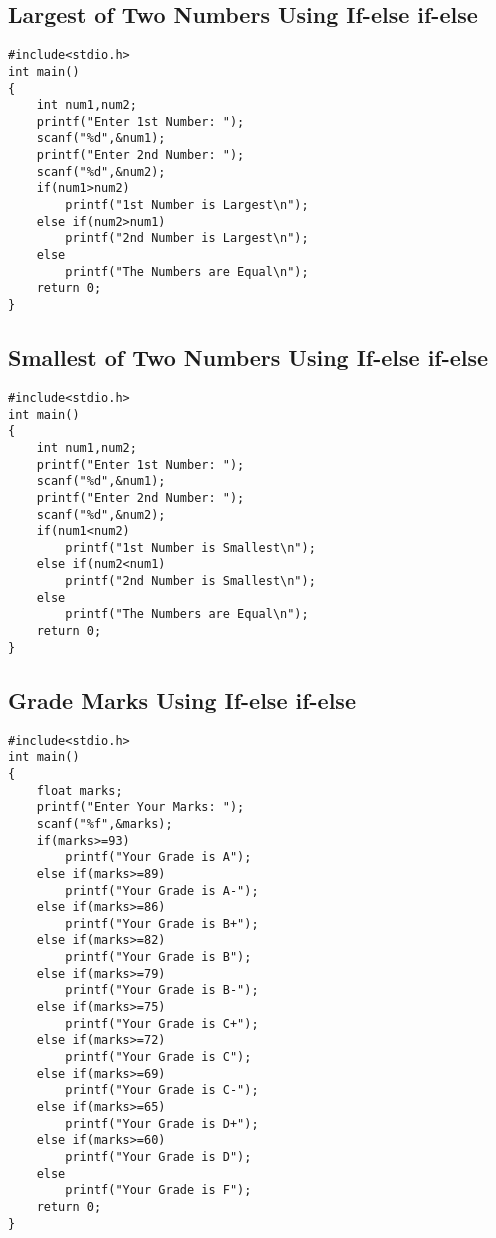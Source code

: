 \documentclass[a4paper,14pt]{article}
\begin{document}
\subsection{Largest of Two Numbers Using If-else if-else}
\vspace{0.5cm}
\begin{lstlisting}[caption={Largest of Two Numbers Using If-else if-else}]
#include<stdio.h>
int main()
{
    int num1,num2;
    printf("Enter 1st Number: ");
    scanf("%d",&num1);
    printf("Enter 2nd Number: ");
    scanf("%d",&num2);
    if(num1>num2)
        printf("1st Number is Largest\n");
    else if(num2>num1)
        printf("2nd Number is Largest\n");
    else
        printf("The Numbers are Equal\n");
    return 0;
}
\end{lstlisting}
\newpage

\subsection{Smallest of Two Numbers Using If-else if-else}
\vspace{0.5cm}
\begin{lstlisting}[caption={Smallest of Two Numbers Using If-else if-else}]
#include<stdio.h>
int main()
{
    int num1,num2;
    printf("Enter 1st Number: ");
    scanf("%d",&num1);
    printf("Enter 2nd Number: ");
    scanf("%d",&num2);
    if(num1<num2)
        printf("1st Number is Smallest\n");
    else if(num2<num1)
        printf("2nd Number is Smallest\n");
    else
        printf("The Numbers are Equal\n");
    return 0;
}
\end{lstlisting}
\newpage

\subsection{Grade Marks Using If-else if-else}
\vspace{0.5cm}
\begin{lstlisting}[caption={Grade Marks Using If-else if-else}]
#include<stdio.h>
int main()
{
    float marks;
    printf("Enter Your Marks: ");
    scanf("%f",&marks);
    if(marks>=93)
        printf("Your Grade is A");
    else if(marks>=89)
        printf("Your Grade is A-");
    else if(marks>=86)
        printf("Your Grade is B+");
    else if(marks>=82)
        printf("Your Grade is B");
    else if(marks>=79)
        printf("Your Grade is B-");
    else if(marks>=75)
        printf("Your Grade is C+");
    else if(marks>=72)
        printf("Your Grade is C");
    else if(marks>=69)
        printf("Your Grade is C-");
    else if(marks>=65)
        printf("Your Grade is D+");
    else if(marks>=60)
        printf("Your Grade is D");
    else
        printf("Your Grade is F");
    return 0;
}
\end{lstlisting}
\newpage
\end{document}
